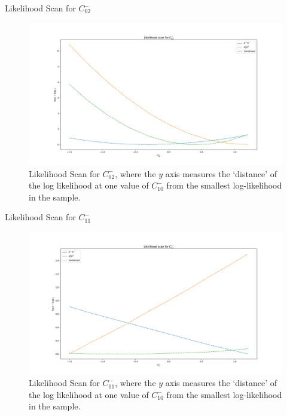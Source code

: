 \begin{frame}{Likelihood Scan for $C_{02}^{-}$}
\begin{figure}
    \centering
        \includegraphics[width=\textwidth]{2020_04_23/figs/M02_Norm.png}
    \caption{Likelihood Scan for $C_{02}^{-}$, where the $y$ axis measures the `distance' of the log likelihood at one value of $C_{10}^{-}$ from the smallest log-likelihood in the sample.}
    \label{fig:scanCM02}
\end{figure}
\end{frame}

\begin{frame}{Likelihood Scan for $C_{11}^{-}$}
\begin{figure}
    \centering
        \includegraphics[width=\textwidth]{2020_04_23/figs/M11_Norm.png}
    \caption{Likelihood Scan for $C_{11}^{-}$, where the $y$ axis measures the `distance' of the log likelihood at one value of $C_{10}^{-}$ from the smallest log-likelihood in the sample.}
    \label{fig:scanCM11}
\end{figure}
\end{frame}


